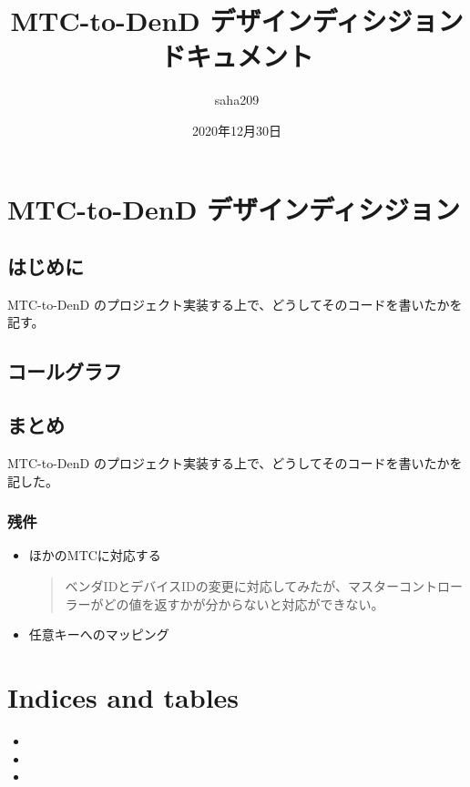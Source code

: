 \documentclass[letterpaper,10pt,dvipdfmx,openany]{sphinxmanual}
\title{MTC-to-DenD デザインディシジョンドキュメント}
\date{2020年12月30日}
\author{saha209}
\begin{document}
\pagestyle{empty}
\sphinxmaketitle
\pagestyle{plain}
\sphinxtableofcontents
\pagestyle{normal}
\label{\detokenize{index::doc}}



\chapter{MTC-to-DenD デザインディシジョン}
\label{\detokenize{doc/designDecision:mtc-to-dend}}\label{\detokenize{doc/designDecision::doc}}

\section{はじめに}
\label{\detokenize{doc/designDecision:id1}}
MTC-to-DenD のプロジェクト実装する上で、どうしてそのコードを書いたかを記す。


\section{コールグラフ}
\label{\detokenize{doc/designDecision:id2}}


\section{まとめ}
\label{\detokenize{doc/designDecision:id3}}
MTC-to-DenD のプロジェクト実装する上で、どうしてそのコードを書いたかを記した。


\subsection{残件}
\label{\detokenize{doc/designDecision:id4}}\begin{itemize}
\item {} 
ほかのMTCに対応する
\begin{quote}

ベンダIDとデバイスIDの変更に対応してみたが、マスターコントローラーがどの値を返すかが分からないと対応ができない。
\end{quote}

\item {} 
任意キーへのマッピング

\end{itemize}


\chapter{Indices and tables}
\label{\detokenize{index:indices-and-tables}}\begin{itemize}
\item {} 

\item {} 

\item {} 

\end{itemize}



\renewcommand{\indexname}{索引}
\printindex
\end{document}
